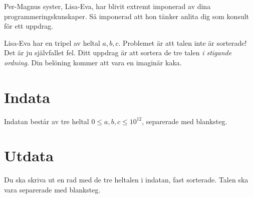 
Per-Magnus syster, Lisa-Eva, har blivit extremt imponerad av dina programmeringskunskaper. Så imponerad att hon tänker anlita dig som konsult för ett uppdrag.

Lisa-Eva har en tripel av heltal $a, b, c$. Problemet är att talen inte är sorterade! 
Det är ju självfallet fel. Ditt uppdrag är att sortera de tre talen \emph{i stigande ordning}. Din belöning kommer att vara en imaginär kaka.

\section*{Indata}

Indatan består av tre heltal $0 \le a, b, c \le 10^{12}$, separerade med blanksteg.

\section*{Utdata}
Du ska skriva ut en rad med de tre heltalen i indatan, fast sorterade. Talen ska vara separerade med blanksteg.
